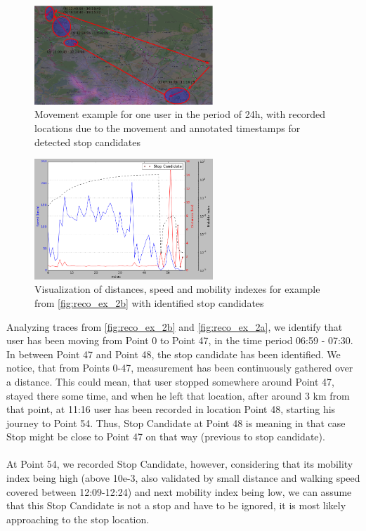 \begin{figure}[!ht]
	\centering
	\includegraphics[width=0.6\textwidth]{images/reco_example_2b.png}
	\caption{ Movement example for one user in the period of 24h, with recorded locations due to the movement and annotated timestamps for detected stop candidates }
	\label{fig:reco_ex_2b}
\end{figure}
\begin{figure}[!ht]
	\centering
	\includegraphics[width=0.6\textwidth]{images/reco_example_2a.png}
	\caption{ Visualization of distances, speed and mobility indexes for example from \autoref{fig:reco_ex_2b} with identified stop candidates }
	\label{fig:reco_ex_2a}
\end{figure} 
Analyzing traces from \autoref{fig:reco_ex_2b} and \autoref{fig:reco_ex_2a}, we identify that user has been moving from Point 0 to Point 47, in the time period 06:59 - 07:30. In between Point 47 and Point 48, the stop candidate has been identified. We notice, that from Points 0-47, measurement has been continuously gathered over a distance. This could mean, that user stopped somewhere around Point 47, stayed there some time, and when he left that location, after around 3 km from that point, at 11:16 user has been recorded in location Point 48, starting his journey to Point 54. Thus, Stop Candidate at Point 48 is meaning in that case Stop might be close to Point 47 on that way (previous to stop candidate). 
\\\\
At Point 54, we recorded Stop Candidate, however, considering that its mobility index being high (above 10e-3, also validated by small distance and walking speed covered between 12:09-12:24) and next mobility index being low, we can assume that this Stop Candidate is not a stop and have to be ignored, it is most likely approaching to the stop location. 
